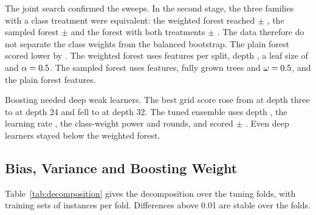 \documentclass[10pt,conference]{IEEEtran}
\begin{document}


The joint search confirmed the sweeps. In the second stage, the three families with a class treatment were equivalent: the weighted forest reached \OJWeightedF{} $\pm$ \OJWeightedFStd{}, the sampled forest \OJSampledF{} $\pm$ \OJSampledFStd{} and the forest with both treatments \OJBothF{} $\pm$ \OJBothFStd{}. The data therefore do not separate the class weights from the balanced bootstrap. The plain forest scored lower by \OJPlainGap{}. The weighted forest uses \OJWeightedFeatures{} features per split, depth \OJWeightedDepth{}, a leaf size of \OJWeightedLeaf{} and $\alpha = 0.5$. The sampled forest uses \OJSampledFeatures{} features, fully grown trees and $\omega = 0.5$, and the plain forest \OJPlainFeatures{} features.

Boosting needed deep weak learners. The best grid score rose from \OBoostGridDepthThreeBest{} at depth three to \OBoostGridDepthTwentyFourBest{} at depth 24 and fell to \OBoostGridDepthThirtyTwoBest{} at depth 32. The tuned ensemble uses depth \OBoostTunedDepth{}, the learning rate \OBoostTunedRate{}, the class-weight power \OBoostTunedAlpha{} and \OBoostTunedRounds{} rounds, and scored \OBoostTunedF{} $\pm$ \OBoostTunedFStd{}. Even deep learners stayed below the weighted forest.

\subsection{Bias, Variance and Boosting Weight}
\label{sec:res-bias}

Table~\ref{tab:decomposition} gives the decomposition over the \OBvFolds{} tuning folds, with \OBvSets{} training sets of \OBvRows{} instances per fold. Differences above 0.01 are stable over the folds.


\end{document}
